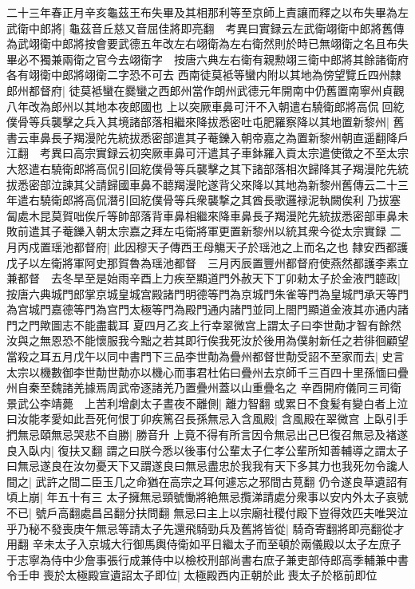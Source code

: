 二十三年春正月辛亥龜茲王布失畢及其相那利等至京師上責讓而釋之以布失畢為左武衛中郎將|{
	龜茲音丘慈又音屈佳將即亮翻　考異曰實録云左武衛翊衛中郎將舊傳為武翊衛中郎將按會要武德五年改左右翊衛為左右衛然則於時已無翊衛之名且布失畢必不獨兼兩衛之官今去翊衛字　按唐六典左右衛有親勲翊三衛中郎將其餘諸衛府各有翊衛中郎將翊衛二字恐不可去}
西南徒莫袛等蠻内附以其地為傍望覽丘四州隸郎州都督府|{
	徒莫袛蠻在爨蠻之西郎州當作朗州武德元年開南中仍舊置南寧州貞觀八年改為郎州以其地本夜郎國也}
上以突厥車鼻可汗不入朝遣右驍衛郎將高侃回紇僕骨等兵襲擊之兵入其境諸部落相繼來降拔悉密吐屯肥羅察降以其地置新黎州|{
	舊書云車鼻長子羯漫陀先統拔悉密部遣其子菴鑠入朝帝嘉之為置新黎州朝直遥翻降戶江翻　考異曰高宗實録云初突厥車鼻可汗遣其子車鉢羅入貢太宗遣使徵之不至太宗大怒遣右驍衛郎將高侃引回紇僕骨等兵襲擊之其下諸部落相次歸降其子羯漫陀先統拔悉密部泣諫其父請歸國車鼻不聼羯漫陀遂背父來降以其地為新黎州舊傳云二十三年遣右驍衛郎將高侃潛引回紇僕骨等兵衆襲撃之其酋長歌邏禄泥執闕俟利乃拔塞匐處木昆莫賀咄俟斤等帥部落背車鼻相繼來降車鼻長子羯漫陀先統拔悉密部車鼻未敗前遣其子菴鑠入朝太宗嘉之拜左屯衛將軍更置新黎州以統其衆今從太宗實録}
二月丙戍置瑶池都督府|{
	此因穆天子傳西王母觴天子於瑶池之上而名之也}
隸安西都護戊子以左衛將軍阿史那賀魯為瑶池都督　三月丙辰置豐州都督府使燕然都護李素立兼都督　去冬旱至是始雨辛酉上力疾至顯道門外赦天下丁卯勑太子於金液門聼政|{
	按唐六典城門郎掌京城皇城宫殿諸門明德等門為京城門朱雀等門為皇城門承天等門為宫城門嘉德等門為宫門太極等門為殿門通内諸門並同上閤門顯道金液其亦通内諸門之門歟圖志不能盡載耳}
夏四月乙亥上行幸翠微宫上謂太子曰李世勣才智有餘然汝與之無恩恐不能懷服我今黜之若其即行俟我死汝於後用為僕射新任之若徘徊顧望當殺之耳五月戊午以同中書門下三品李世勣為疊州都督世勣受詔不至家而去|{
	史言太宗以機數御李世勣世勣亦以機心而事君杜佑曰疊州去京師千三百四十里孫愐曰疊州自秦至魏諸羌據焉周武帝逐諸羌乃置疊州蓋以山重疊名之}
辛酉開府儀同三司衛景武公李靖薨　上苦利增劇太子晝夜不離側|{
	離力智翻}
或累日不食髪有變白者上泣曰汝能孝愛如此吾死何恨丁卯疾篤召長孫無忌入含風殿|{
	含風殿在翠微宫}
上臥引手捫無忌頤無忌哭悲不自勝|{
	勝音升}
上竟不得有所言因令無忌出己巳復召無忌及褚遂良入臥内|{
	復扶又翻}
謂之曰朕今悉以後事付公輩太子仁孝公輩所知善輔導之謂太子曰無忌遂良在汝勿憂天下又謂遂良曰無忌盡忠於我我有天下多其力也我死勿令讒人間之|{
	武許之間二臣玉几之命猶在高宗之耳何遽忘之邪間古莧翻}
仍令遂良草遺詔有頃上崩|{
	年五十有三}
太子擁無忌頸號慟將絶無忌攬涕請處分衆事以安内外太子哀號不已|{
	號戶高翻處昌呂翻分扶問翻}
無忌曰主上以宗廟社稷付殿下豈得效匹夫唯哭泣乎乃秘不發喪庚午無忌等請太子先還飛騎勁兵及舊將皆從|{
	騎奇寄翻將即亮翻從才用翻}
辛未太子入京城大行御馬輿侍衛如平日繼太子而至頓於兩儀殿以太子左庶子于志寧為侍中少詹事張行成兼侍中以檢校刑部尚書右庶子兼吏部侍郎高季輔兼中書令壬申喪於太極殿宣遺詔太子即位|{
	太極殿西内正朝於此喪太子於柩前即位}
